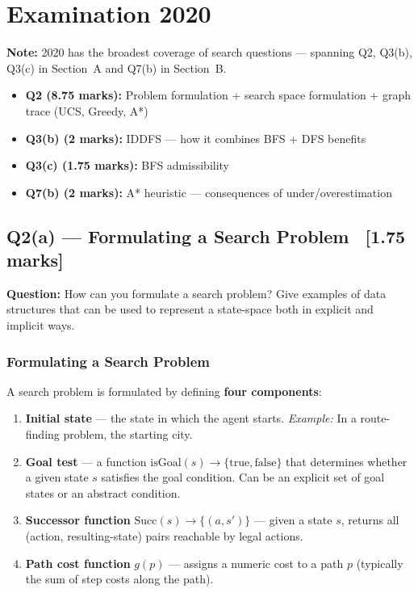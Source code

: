 \documentclass[12pt, a4paper]{article}
\newenvironment{solutionbox}{\begin{mdframed}[style=solutionframe]}{\end{mdframed}}
\begin{document}
\newpage
\section{Examination 2020}

\textbf{Note:} 2020 has the broadest coverage of search questions — spanning Q2, Q3(b), Q3(c) in Section~A and Q7(b) in Section~B.

\begin{itemize}[noitemsep]
  \item \textbf{Q2 (8.75 marks):} Problem formulation + search space formulation + graph trace (UCS, Greedy, A*)
  \item \textbf{Q3(b) (2 marks):} IDDFS — how it combines BFS + DFS benefits
  \item \textbf{Q3(c) (1.75 marks):} BFS admissibility
  \item \textbf{Q7(b) (2 marks):} A* heuristic — consequences of under/overestimation
\end{itemize}

\subsection{Q2(a) — Formulating a Search Problem \ [1.75 marks]}

\begin{solutionbox}
\textbf{Question:} How can you formulate a search problem? Give examples of data structures that can be used to represent a state-space both in explicit and implicit ways.
\end{solutionbox}

\subsubsection*{Formulating a Search Problem}

A search problem is formulated by defining \textbf{four components}:

\begin{enumerate}[noitemsep]
  \item \textbf{Initial state} — the state in which the agent starts. \emph{Example:} In a route-finding problem, the starting city.
  \item \textbf{Goal test} — a function $\text{isGoal}(s) \to \{\text{true}, \text{false}\}$ that determines whether a given state $s$ satisfies the goal condition. Can be an explicit set of goal states or an abstract condition.
  \item \textbf{Successor function} $\text{Succ}(s) \to \{(a, s')\}$ — given a state $s$, returns all (action, resulting-state) pairs reachable by legal actions.
  \item \textbf{Path cost function} $g(p)$ — assigns a numeric cost to a path $p$ (typically the sum of step costs along the path).
\end{enumerate}
\end{document}
